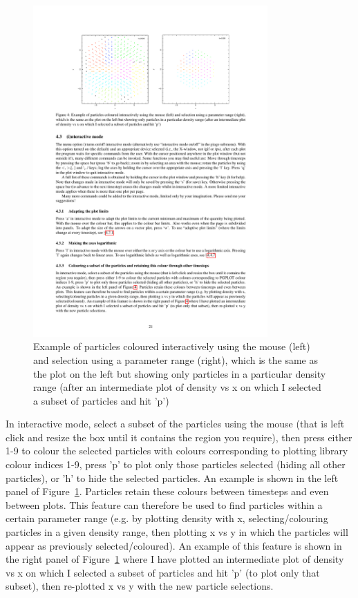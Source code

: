\documentclass[a4paper,10pt]{article}
\begin{document}
\begin{figure}
\centering
\includegraphics[width=0.8\textwidth]{colourparts.pdf}
\caption{Example of particles coloured interactively using the mouse (left) and selection using a parameter range (right), which is the same as the plot on the left but showing only particles in a particular density range (after an intermediate plot of density vs x on which I selected a subset of particles and hit 'p')}
\label{fig:colourparts}
\end{figure}

 In interactive mode, select a subset of the particles using the mouse (that is left click and resize the box until it contains the region you require), then press either 1-9 to colour the selected particles with colours corresponding to plotting library colour indices 1-9, press 'p' to plot only those particles selected (hiding all other particles), or 'h' to hide the selected particles. An example is shown in the left panel of Figure~\ref{fig:colourparts}.  Particles retain these colours between timesteps and even between plots. This feature can therefore be used to find particles within a certain parameter range (e.g. by plotting density with x, selecting/colouring particles in a given density range, then plotting x vs y in which the particles will appear as previously selected/coloured). An example of this feature is shown in the right panel of Figure~\ref{fig:colourparts} where I have plotted an intermediate plot of density vs x on which I selected a subset of particles and hit 'p' (to plot only that subset), then re-plotted x vs y with the new particle selections.
 
\end{document}
